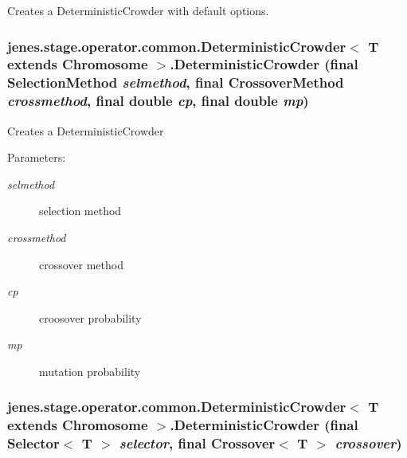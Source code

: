 Creates a DeterministicCrowder with default options. \hypertarget{classjenes_1_1stage_1_1operator_1_1common_1_1_deterministic_crowder_3_01_t_01extends_01_chromosome_01_4_a59e2a1dcdb2cd6cc7a70e344a77dd31}{
\subsubsection[DeterministicCrowder]{\setlength{\rightskip}{0pt plus 5cm}jenes.stage.operator.common.DeterministicCrowder$<$ T extends Chromosome $>$.DeterministicCrowder (final {\bf SelectionMethod} {\em selmethod}, \/  final {\bf CrossoverMethod} {\em crossmethod}, \/  final double {\em cp}, \/  final double {\em mp})}}
\label{classjenes_1_1stage_1_1operator_1_1common_1_1_deterministic_crowder_3_01_t_01extends_01_chromosome_01_4_a59e2a1dcdb2cd6cc7a70e344a77dd31}


Creates a DeterministicCrowder

\begin{Desc}
\item[Parameters:]
\begin{description}
\item[{\em selmethod}]selection method \item[{\em crossmethod}]crossover method \item[{\em cp}]croosover probability \item[{\em mp}]mutation probability \end{description}
\end{Desc}
\hypertarget{classjenes_1_1stage_1_1operator_1_1common_1_1_deterministic_crowder_3_01_t_01extends_01_chromosome_01_4_d7eed64a7fe60239ba3289ebf6003e8c}{
\subsubsection[DeterministicCrowder]{\setlength{\rightskip}{0pt plus 5cm}jenes.stage.operator.common.DeterministicCrowder$<$ T extends Chromosome $>$.DeterministicCrowder (final Selector$<$ T $>$ {\em selector}, \/  final Crossover$<$ T $>$ {\em crossover})}}
\label{classjenes_1_1stage_1_1operator_1_1common_1_1_deterministic_crowder_3_01_t_01extends_01_chromosome_01_4_d7eed64a7fe60239ba3289ebf6003e8c}


